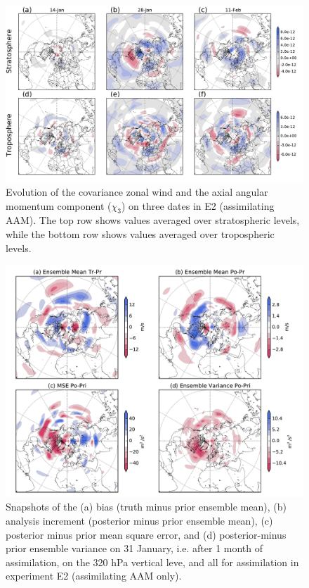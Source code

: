  \begin{figure}
	 \includegraphics[width=\textwidth]{Paper_figures/ERPDA_paper_U_to_LOD_covariances_.pdf}
	 \caption{Evolution of the covariance zonal wind and the axial angular momentum component ($\chi_3$) on three dates in E2 (assimilating AAM). The top row shows values averaged over stratospheric levels, while the bottom row shows values averaged over tropospheric levels.}
 \label{fig:covariances}
\end{figure}

 \begin{figure}
	 \includegraphics[width=\textwidth]{Paper_figures/ERPDA_paper_U_priorerror_vs_increment_vs_ER_31jan.pdf}
	 \caption{Snapshots of the (a) bias (truth minus prior ensemble mean), (b) analysis increment (posterior minus prior ensemble mean), (c) posterior minus prior mean square error, and (d) posterior-minus prior ensemble variance on 31 January, i.e. after 1 month of assimilation, on the 320 hPa vertical leve, and all for assimilation in experiment E2 (assimilating AAM only). } 
 \label{fig:error_increments}
\end{figure}



